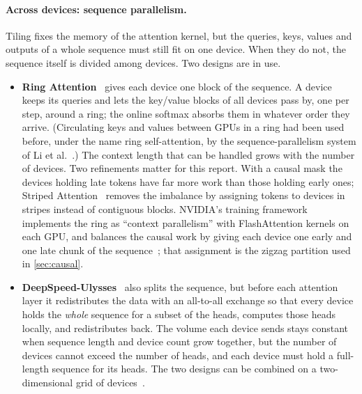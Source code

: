 \paragraph{Across devices: sequence parallelism.} Tiling fixes the memory of the
attention kernel, but the queries, keys, values and outputs of a whole sequence
must still fit on one device. When they do not, the sequence itself is divided
among devices. Two designs are in use.
\begin{itemize}
\item \textbf{Ring Attention}~\cite{ring} gives each device one block of the
sequence. A device keeps its queries and lets the key/value blocks of all devices
pass by, one per step, around a ring; the online softmax absorbs them in whatever
order they arrive. (Circulating keys and values between GPUs in a ring had been
used before, under the name ring self-attention, by the sequence-parallelism
system of Li et al.~\cite{seqpar}.) The context length that can be handled grows with the number of
devices. Two refinements matter for this report. With a causal mask the devices
holding late tokens have far more work than those holding early ones; Striped
Attention~\cite{striped} removes the imbalance by assigning tokens to devices in
stripes instead of contiguous blocks. NVIDIA's training framework implements the
ring as ``context parallelism'' with FlashAttention kernels on each GPU, and
balances the causal work by giving each device one early and one late chunk of the
sequence~\cite{megatroncp}; that assignment is the zigzag partition used in
\cref{sec:causal}.
\item \textbf{DeepSpeed-Ulysses}~\cite{ulysses} also splits the sequence, but before
each attention layer it redistributes the data with an all-to-all exchange so that
every device holds the \emph{whole} sequence for a subset of the heads, computes
those heads locally, and redistributes back. The volume each device sends stays
constant when sequence length and device count grow together, but the number of
devices cannot exceed the number of heads, and each device must hold a full-length
sequence for its heads. The two
designs can be combined on a two-dimensional grid of devices~\cite{usp}.
\end{itemize}

